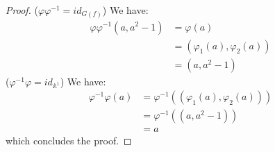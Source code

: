 \documentclass{article}
\begin{document}
\begin{itemize}
\begin{proof}
                    ($\varphi\varphi^{-1} = id_{G(f)}$) We have:
                        \begin{align*}
                            \varphi\varphi^{-1}(a, a^{2} - 1) &= \varphi(a)                       \\
                                                              &= (\varphi_{1}(a), \varphi_{2}(a)) \\
                                                              &= (a, a^{2} - 1)                     
                        \end{align*}
                    ($\varphi^{-1}\varphi = id_{\mathbb{A}^{1}}$) We have:
                        \begin{align*}
                            \varphi^{-1}\varphi(a) &= \varphi^{-1}((\varphi_{1}(a), \varphi_{2}(a))) \\
                                                   &= \varphi^{-1}((a, a^{2} - 1))                   \\
                                                   &= a                                                
                        \end{align*}
                    which concludes the proof.
                \end{proof}
        \end{itemize}
\end{document}
